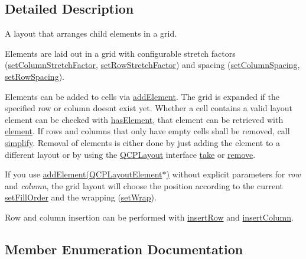\subsection{Detailed Description}
A layout that arranges child elements in a grid. 

Elements are laid out in a grid with configurable stretch factors (\hyperlink{class_q_c_p_layout_grid_ae38f31a71687b9d7ee3104852528fb50}{set\+Column\+Stretch\+Factor}, \hyperlink{class_q_c_p_layout_grid_a7b0273de5369bd93d942edbaf5b166ec}{set\+Row\+Stretch\+Factor}) and spacing (\hyperlink{class_q_c_p_layout_grid_a3a49272aba32bb0fddc3bb2a45a3dba0}{set\+Column\+Spacing}, \hyperlink{class_q_c_p_layout_grid_aaef2cd2d456197ee06a208793678e436}{set\+Row\+Spacing}).

Elements can be added to cells via \hyperlink{class_q_c_p_layout_grid_adff1a2ca691ed83d2d24a4cd1fe17012}{add\+Element}. The grid is expanded if the specified row or column doesn\textquotesingle{}t exist yet. Whether a cell contains a valid layout element can be checked with \hyperlink{class_q_c_p_layout_grid_ab0cf4f7edc9414a3bfaddac0f46dc0a0}{has\+Element}, that element can be retrieved with \hyperlink{class_q_c_p_layout_grid_a525f25e6ba43ee228151d074251b4e6a}{element}. If rows and columns that only have empty cells shall be removed, call \hyperlink{class_q_c_p_layout_grid_a38621ca7aa633b6a9a88617df7f08672}{simplify}. Removal of elements is either done by just adding the element to a different layout or by using the \hyperlink{class_q_c_p_layout}{Q\+C\+P\+Layout} interface \hyperlink{class_q_c_p_layout_grid_aee961c2eb6cf8a85dcbc5a7d7b6c1a00}{take} or \hyperlink{class_q_c_p_layout_a6c58f537d8086f352576ab7c5b15d0bc}{remove}.

If you use \hyperlink{class_q_c_p_layout_grid_a4c44025dd25acd27e053cadfd448ad7b}{add\+Element(\+Q\+C\+P\+Layout\+Element$\ast$)} without explicit parameters for {\itshape row} and {\itshape column}, the grid layout will choose the position according to the current \hyperlink{class_q_c_p_layout_grid_affc2f3cfd22f28698c5b29b960d2a391}{set\+Fill\+Order} and the wrapping (\hyperlink{class_q_c_p_layout_grid_ab36af18d77e4428386d02970382ee598}{set\+Wrap}).

Row and column insertion can be performed with \hyperlink{class_q_c_p_layout_grid_a48af3dd7c3a653d9c3d7dd99bd02e838}{insert\+Row} and \hyperlink{class_q_c_p_layout_grid_a1e880a321dbe8b43b471ccd764433dc4}{insert\+Column}. 

\subsection{Member Enumeration Documentation}
